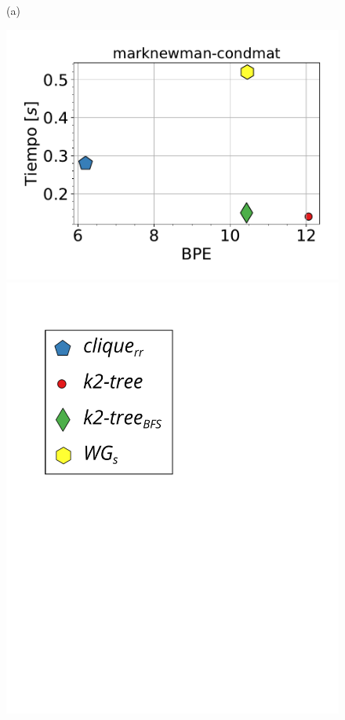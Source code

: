\begin{figure}
\begin{minipage}{1\textwidth}
\begin{minipage}{0.45\textwidth}
    			(a)
    		\end{minipage}
    		\begin{minipage}{0.45\textwidth}
    			\centering
    			\begin{minipage}{0.75\textwidth}
    				\centering
    				\includegraphics[width=1\linewidth]{img/bpeTimes/secuencial/marknewman-condmat.pdf}
    			\end{minipage}
    			\begin{minipage}{0.2\textwidth}
    				\centering
    				\includegraphics[scale=.2, clip, trim=60 194 0 0]{img/bpeTimes/labelSec.pdf}
    			\end{minipage}
    			

\end{minipage}
\end{minipage}
\end{figure}
